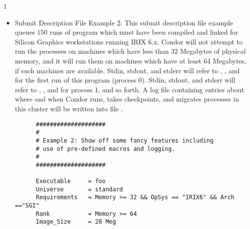\begin{ManPage}{\label{man-condor-submit}}{1}
\begin{itemize}
\begin{verbatim}
      Arguments      = 15 2000                                               
      Output  = foo.out1                                                     
      Error   = foo.err1
      Queue                                                                  
                                                                         
      Arguments      = 30 2000                                               
      Output  = foo.out2                                                     
      Error   = foo.err2
      Queue                                                                  
                                                                         
      Arguments      = 45 6000                                               
      Output  = foo.out3                                                     
      Error   = foo.err3
      Queue                   
\end{verbatim}

\item{Submit Description File Example 2:} This submit description file
example queues 150
runs of program  which must have been compiled and linked for
Silicon Graphics workstations running IRIX 6.x.
Condor will not attempt
to run the processes on machines which have less than 32 Megabytes of
physical memory, and it will run them on machines which have at least 64
Megabytes, if such machines are available.
Stdin, stdout, and stderr will
refer to , , and  for the first run
of this program (process 0).
Stdin, stdout, and stderr will refer to
, , and  for process 1, and so forth.
A log file containing entries
about where and when Condor runs, takes checkpoints, and migrates processes
in this cluster will be written into file .

\begin{verbatim}
      ####################                                                    
      #                                                                       
      # Example 2: Show off some fancy features including
      # use of pre-defined macros and logging.                                
      #                                                                       
      ####################                                                    
                                                                          
      Executable     = foo                                                    
      Universe       = standard
      Requirements   = Memory >= 32 && OpSys == "IRIX6" && Arch =="SGI"     
      Rank           = Memory >= 64
      Image_Size     = 28 Meg                                                 
                                                                          

\end{verbatim}
\end{itemize}
\end{ManPage}
